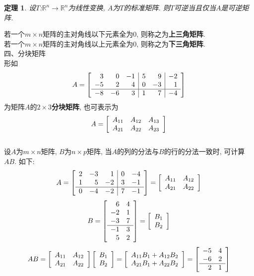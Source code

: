 \documentclass[UTF8,fontset=ubuntu]{ctexart}
\theoremstyle{plain}
\newtheorem{theorem}{定理}
\theoremstyle{nonumberplain}
\theoremstyle{empty}
\begin{document}
\begin{theorem}
设$T$:$\mathbb{R}^n\rightarrow\mathbb{R}^n$为线性变换, $A$为$T$的标准矩阵. 则$T$可逆当且仅当$A$是可逆矩阵.
\end{theorem}\vspace{4ex}

若一个$m\times n$矩阵的主对角线以下元素全为0, 则称之为\textbf{上三角矩阵}.\\[1ex]
若一个$m\times n$矩阵的主对角线以上元素全为0, 则称之为\textbf{下三角矩阵}.\\[4ex]

四、分块矩阵\\[1ex]
形如
\[A=\left[
\begin{array}{r r r|r r|r}
3 & 0 & -1 & 5 & 9 & -2\\
-5 & 2 & 4 & 0 & -3 & 1\\\hline
-8 & -6 & 3 & 1 & 7 & -4
\end{array}
\right]\]
为矩阵$A$的$2\times 3$\textbf{分块矩阵}, 也可表示为
\[A=\left[
\begin{array}{l l l}
A_{11} & A_{12} & A_{13}\\
A_{21} & A_{22} & A_{23}
\end{array}
\right]\]\\[2ex]

设$A$为$m\times n$矩阵, $B$为$n\times p$矩阵, 当$A$的列的分法与$B$的行的分法一致时, 可计算$AB$. 如下:
\[A=\left[\begin{array}{r r r|r r}
2 & -3 & 1 & 0 & -4\\
1 & 5 & -2 & 3 & -1\\\hline
0 & -4 & -2 & 7 & -1
\end{array}\right]=
\left[\begin{array}{l l}
A_{11} & A_{12}\\
A_{21} & A_{22}
\end{array}\right]\]
\[B=\left[\begin{array}{r r}
6 & 4\\
-2 & 1\\
-3 & 7\\\hline
-1 & 3\\
5 & 2
\end{array}\right]=
\left[\begin{array}{l}
B_1\\
B_2
\end{array}\right]\]
\[AB=\left[
\begin{array}{l l}
A_{11} & A_{12}\\
A_{21} & A_{22}
\end{array}
\right]\left[
\begin{array}{l}
B_1\\
B_2
\end{array}
\right]=\left[
\begin{array}{l}
A_{11}B_1+A_{12}B_2\\
A_{21}B_1+A_{22}B_2
\end{array}
\right]=\left[
\begin{array}{r r}
-5 & 4\\
-6 & 2\\\hline
2 & 1
\end{array}
\right]\]\\[2ex]
\end{document}
